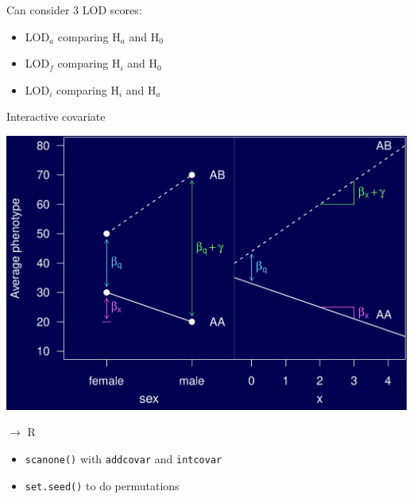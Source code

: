 \documentclass[12pt]{article}
\newcommand{\headsize}{\fontsize{35}{35} \selectfont}
\newcommand{\smallsize}{\fontsize{25}{30} \selectfont}
\begin{document}
\hspace{0.5in}
\begin{minipage}{9.5in}
Can consider 3 LOD scores:
  \begin{itemize}
    \item LOD$_a$ comparing H$_a$ and H$_0$
    \item LOD$_f$ comparing H$_i$ and H$_0$
    \item LOD$_i$ comparing H$_i$ and H$_a$
  \end{itemize}
\end{minipage}

\newpage

\headsize \color{myyellow}
\hfill \begin{minipage}{5.75in}
\centering
Interactive covariate
\end{minipage}

\vfill

\centerline{\includegraphics{Figs/intcovar.pdf}}


\newpage

\headsize \color{myyellow}
$\boldsymbol{\rightarrow}$ R

\vspace{3cm}

\color{mywhite} \smallsize

\hfill \begin{minipage}[t]{9.5in}
\begin{itemize}
\itemsep24pt
\item \verb|scanone()| with \verb|addcovar| and \verb|intcovar|
\item \verb|set.seed()| to do permutations
\end{itemize} \end{minipage}
\end{document}
